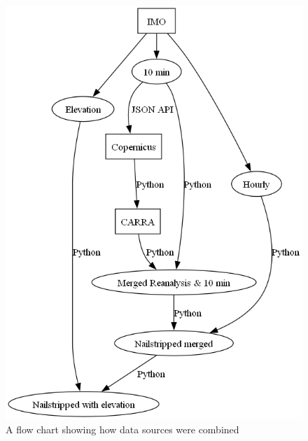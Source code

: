 \begin{figure}[h]
    \includegraphics[scale = 0.5]{Figures/data-preprocessing-flow-chart.png}
    \caption{A flow chart showing how data sources were combined}
    \label{fig:data_preprocessing_flow_chart}
\end{figure}


